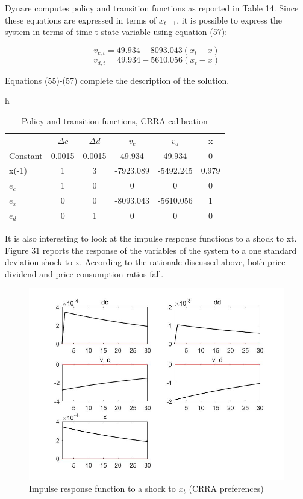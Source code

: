\documentclass[a4paper,12pt]{scrartcl} %
\begin{document}
Dynare computes policy and transition functions as reported in Table 14. Since these equations are expressed in terms of $x_{t-1}$, it is possible to express the system in terms of time t state variable using equation (57):

$$v_{c,t}=49.934-8093.043(x_t-\overline{x})$$
$$v_{d,t}=49.934-5610.056(x_t-\overline{x})$$

Equations (55)-(57) complete the description of the solution.

\begin{table}{h}
\centering
\caption{Policy and transition functions, CRRA calibration}\label{14}
\begin{tabular}{lccccc}
\hline
&$\Delta c$&$\Delta d$&$v_c$&$v_d$&x\\
Constant&0.0015&0.0015&49.934&49.934&0\\
x(-1)&1&3&-7923.089&-5492.245&0.979\\
$e_c$&1&0&0&0&0\\
$e_x$&0&0&-8093.043&-5610.056&1\\
$e_d$&0&1&0&0&0\\
\hline
\end{tabular}
\end{table}

\vspace{2cm}

It is also interesting to look at the impulse response functions to a shock to xt. Figure 31 reports the response of the variables of the system to a one standard deviation shock to x. According to the rationale discussed above, both price-dividend and price-consumption ratios fall.

\begin{figure}[htbp!]
		\centering
			\includegraphics[width=0.8\linewidth]{fig34.jpg}
            \caption{Impulse response function to a shock to $x_t$ (CRRA preferences)}\label{34}
\end{figure}
\end{document}
